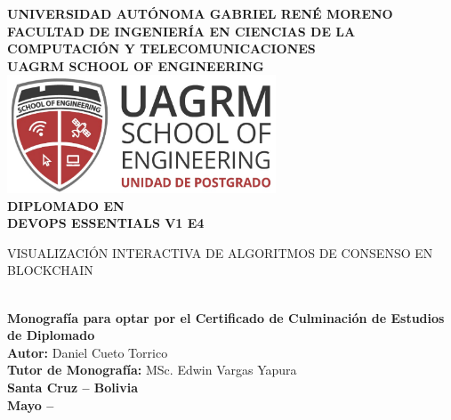 \documentclass[spanish,12pt,letterpaper]{report}
\begin{document}
\sloppy 



\begin{titlepage}
\centering %


{\Large\bfseries UNIVERSIDAD AUTÓNOMA GABRIEL RENÉ MORENO}\\[0.5cm]
{\normalsize\bfseries FACULTAD DE INGENIERÍA EN CIENCIAS DE LA COMPUTACIÓN Y TELECOMUNICACIONES}\\[0.3cm]
{\normalsize\bfseries UAGRM SCHOOL OF ENGINEERING}\\[1cm]

\includegraphics[width=8cm]{logo-postgrado.png}\\[1cm]

{\Large\bfseries DIPLOMADO EN}\\[0.2cm] 
{\Large\bfseries DEVOPS ESSENTIALS V1 E4}\\[1.6cm] 

{\LARGE\bfseries\begin{minipage}{0.9\textwidth}\centering
VISUALIZACIÓN INTERACTIVA DE ALGORITMOS DE CONSENSO EN BLOCKCHAIN
\end{minipage}}\\[1.5cm]

{\large\bfseries Monografía para optar por el Certificado de Culminación de Estudios de Diplomado}\\[1.2cm]

{\large\bfseries Autor:} {\large Daniel Cueto Torrico}\\[0.5cm]
{\large\bfseries Tutor de Monografía:} {\large MSc. Edwin Vargas Yapura}\\[1cm]

{\large\bfseries Santa Cruz – Bolivia}\\[0.2cm]
{\large\bfseries Mayo – \the\year}
\end{titlepage}
\end{document}
